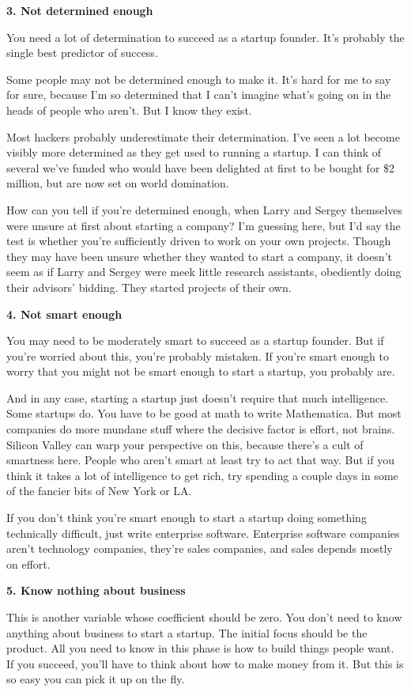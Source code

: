 \textbf{3. Not determined enough}

You need a lot of determination to succeed as a startup founder. It's
probably the single best predictor of success.

Some people may not be determined enough to make it. It's hard for me to
say for sure, because I'm so determined that I can't imagine what's
going on in the heads of people who aren't. But I know they exist.

Most hackers probably underestimate their determination. I've seen a lot
become visibly more determined as they get used to running a startup. I
can think of several we've funded who would have been delighted at first
to be bought for \$2 million, but are now set on world domination.

How can you tell if you're determined enough, when Larry and Sergey
themselves were unsure at first about starting a company? I'm guessing
here, but I'd say the test is whether you're sufficiently driven to work
on your own projects. Though they may have been unsure whether they
wanted to start a company, it doesn't seem as if Larry and Sergey were
meek little research assistants, obediently doing their advisors'
bidding. They started projects of their own.

\textbf{4. Not smart enough}

You may need to be moderately smart to succeed as a startup founder. But
if you're worried about this, you're probably mistaken. If you're smart
enough to worry that you might not be smart enough to start a startup,
you probably are.

And in any case, starting a startup just doesn't require that much
intelligence. Some startups do. You have to be good at math to write
Mathematica. But most companies do more mundane stuff where the decisive
factor is effort, not brains. Silicon Valley can warp your perspective
on this, because there's a cult of smartness here. People who aren't
smart at least try to act that way. But if you think it takes a lot of
intelligence to get rich, try spending a couple days in some of the
fancier bits of New York or LA.

If you don't think you're smart enough to start a startup doing
something technically difficult, just write enterprise software.
Enterprise software companies aren't technology companies, they're sales
companies, and sales depends mostly on effort.

\textbf{5. Know nothing about business}

This is another variable whose coefficient should be zero. You don't
need to know anything about business to start a startup. The initial
focus should be the product. All you need to know in this phase is how
to build things people want. If you succeed, you'll have to think about
how to make money from it. But this is so easy you can pick it up on the
fly.

